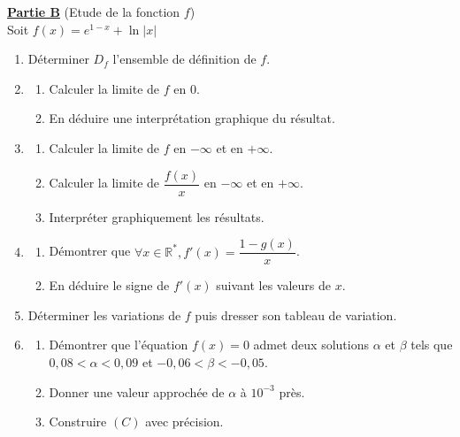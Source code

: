 \documentclass[12pt,a4paper]{article}
\begin{document}
\noindent \underline{\textbf{Partie B}} (Etude de la fonction $f$) \\
Soit $f(x) = e^{1-x} + \ln |x|$
\begin{enumerate}
    \item Déterminer $D_f$ l'ensemble de définition de $f$.
    \item 
    \begin{enumerate}
    \item Calculer la limite de $f$ en 0.
    \item En déduire une interprétation graphique du résultat.
    \end{enumerate}
    \item
    \begin{enumerate}
    \item Calculer la limite de $f$ en $-\infty$ et en $+\infty$. 
    \item Calculer la limite de $\dfrac{f(x)}{x}$ en $-\infty$ et en $+\infty$.
     \item Interpréter graphiquement les résultats.
    \end{enumerate}
  \item
\begin{enumerate}
    \item Démontrer que $\forall x \in \mathbb{R}^*, f'(x) = \dfrac{1-g(x)}{x}$.
    \item En déduire le signe de $f'(x)$ suivant les valeurs de $x$.
\end{enumerate}
    \item Déterminer les variations de $f$ puis dresser son tableau de variation.
    \item 
    \begin{enumerate}
     \item Démontrer que l'équation $f(x) = 0$ admet deux solutions $\alpha$ et $\beta$ tels que $0,08 < \alpha < 0,09$ et $-0,06 < \beta < -0,05$. \\
    \item Donner une valeur approchée de $\alpha$ à $10^{-3}$ près.
    \item Construire $(C)$ avec précision.
    \end{enumerate}
\end{enumerate}

\vspace{0.3cm}
\end{document}
